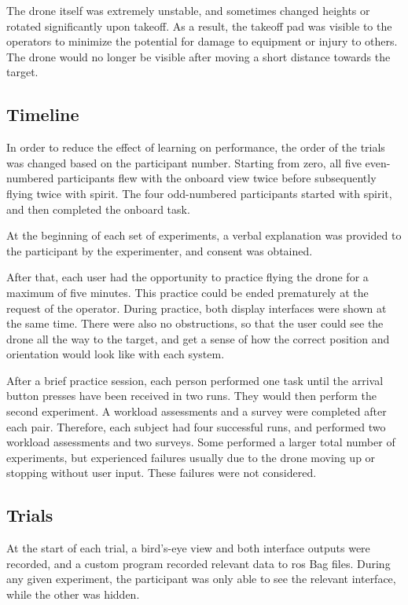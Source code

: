 The drone itself was extremely unstable, and sometimes changed heights or rotated significantly upon takeoff.
As a result, the takeoff pad was visible to the operators to minimize the potential for damage to equipment or injury to others.
The drone would no longer be visible after moving a short distance towards the target.

\subsection{Timeline}
In order to reduce the effect of learning on performance, the order of the trials was changed based on the participant number.
Starting from zero, all five even-numbered participants flew with the onboard view twice before subsequently flying twice with \gls{spirit}.
The four odd-numbered participants started with \gls{spirit}, and then completed the onboard task.

At the beginning of each set of experiments, a verbal explanation was provided to the participant by the experimenter, and consent was obtained.

After that, each user had the opportunity to practice flying the drone for a maximum of five minutes.
This practice could be ended prematurely at the request of the operator.
During practice, both display interfaces were shown at the same time.
There were also no obstructions, so that the user could see the drone all the way to the target, and get a sense of how the correct position and orientation would look like with each system.

After a brief practice session, each person performed one task until the arrival button presses have been received in two runs.
They would then perform the second experiment.
A workload assessments and a survey were completed  after each pair.
Therefore, each subject had four successful runs, and performed two workload assessments and two surveys.
Some performed a larger total number of experiments, but experienced failures usually due to the drone moving up or stopping without user input.
These failures were not considered.

\subsection{Trials}
At the start of each trial, a bird's-eye view and both interface outputs were recorded, and a custom program recorded relevant data to \gls{ros} Bag files.
During any given experiment, the participant was only able to see the relevant interface, while the other was hidden.

